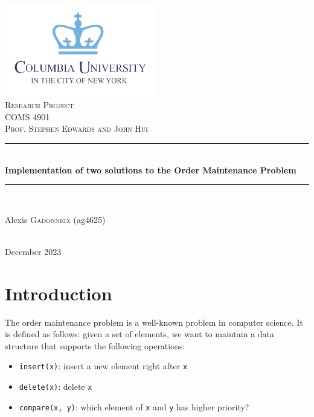 \documentclass[12pt]{article}
\begin{document}
\begin{titlepage}

    \newcommand{\HRule}{\rule{\linewidth}{0.5mm}}

    \center

    \includegraphics[width=250px, keepaspectratio]{./columbia-logo.png}\\[1cm]
    \textsc{\Large Research Project}\\[0.5cm]
    \textsc{\large COMS 4901}\\[0.3cm]
    \textsc{\large Prof. Stephen Edwards and John Hui}\\[0.5cm]

    \HRule \\[0.4cm]
    { \huge \bfseries Implementation of two solutions to the Order Maintenance Problem}\\[0.4cm]
    \HRule \\[1.5cm]

    \begin{minipage}{0.4\textwidth}
        \begin{center} \large
            Alexis \textsc{Gadonneix} (ag4625)\\
        \end{center}

    \end{minipage}\\[2cm]

    {\large December 2023}\\[2cm]

    \vfill

\end{titlepage}


\section{Introduction}

The order maintenance problem is a well-known problem in computer science. It is defined as follows: given a set of elements, we want to maintain a data structure that supports the following operations:
\begin{itemize}
    \item \texttt{insert(x)}: insert a new element right after \texttt{x}
    \item \texttt{delete(x)}: delete \texttt{x}
    \item \texttt{compare(x, y)}: which element of \texttt{x} and \texttt{y} has higher priority?
\end{itemize}
\end{document}

